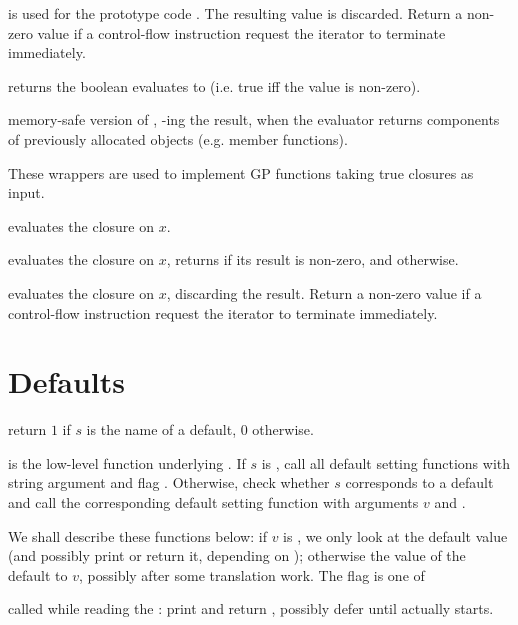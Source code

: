  is used for the prototype code
. The resulting value is discarded.  Return a non-zero value if a
control-flow instruction request the iterator to terminate immediately.

 returns the boolean
 evaluates to (i.e. true iff the value is non-zero).

 memory-safe version of ,
-ing the result, when the evaluator returns components of
previously allocated objects (e.g. member functions).

These wrappers are used to implement GP functions taking true closures as
input.

 evaluates the closure  on $x$.

 evaluates the closure  on
$x$, returns  if its result is non-zero, and  otherwise.

 evaluates the closure  on
$x$, discarding the result. Return a non-zero value if a control-flow
instruction request the iterator to terminate immediately.

\section{Defaults}

 return $1$ if $s$ is the name
of a default, $0$ otherwise.

 is the
low-level function underlying . If $s$ is , call all
default setting functions with string argument  and flag
. Otherwise, check whether $s$ corresponds to a default
and call the corresponding default setting function with arguments $v$ and
\fl.

We shall describe these functions below: if $v$ is , we only look
at the default value (and possibly print or return it, depending on
); otherwise the value of the default to $v$, possibly after some
translation work. The flag is one of

\item {} called while reading the : print and return
, possibly defer until  actually starts.

